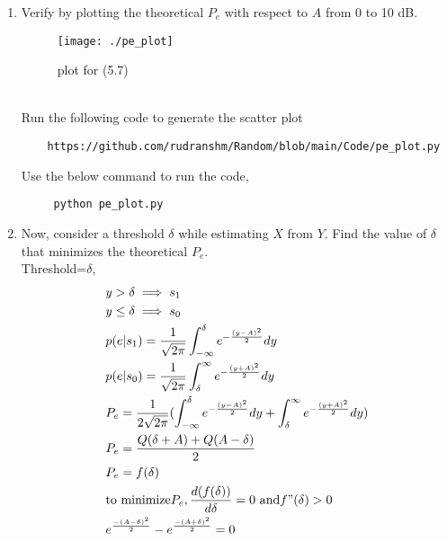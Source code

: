 \documentclass[journal,12pt,twocolumn]{IEEEtran}
\begin{document}
\begin{enumerate}[label=\thesection.\arabic*
,ref=\thesection.\theenumi]
\solution
Total probability of bit error:
\begin{align}
&P_{e}=p(s_1)p(e|s_1)+p(s_0)p(e|s_0)\\
&=\frac{1}{2}[Q(A)+Q(A)]\\
&\because p(s_1)=p(s_0)=\frac{1}{2},\text{X has equiprobable symbols}\\
\nonumber
&=Q(A)\\
&=Q(5)
\end{align}
Since A=5
%
\item
Verify by plotting  the theoretical $P_e$ with respect to $A$ from 0 to 10 dB. \\
\solution
\begin{figure}[!ht]
\texttt{[image: ./pe\_plot]}
\caption{plot for (5.7)}
\label{fig:Plt}
\end{figure}
\\
	Run the following code to generate the scatter plot\\
	\begin{lstlisting}
	https://github.com/rudranshm/Random/blob/main/Code/pe_plot.py
	\end{lstlisting}
	Use the below command to run the code,
	\begin{lstlisting}
     python pe_plot.py 
	\end{lstlisting}
\item Now, consider a threshold $\delta$  while estimating $X$ from $Y$. Find the value of $\delta$ that minimizes the theoretical $P_e$.\\
\solution
Threshold=$\delta$, \\
\begin{align}
 &y>\delta \implies s_1\\
 &y \leq \delta \implies s_0\\
 &p(e|s_1)=\frac{1}{\sqrt{2 \pi}} \int_{-\infty}^{\delta} e^{-\frac{(y-A)^{2}}{2}} dy\\
 \nonumber
 &p(e|s_0)=\frac{1}{\sqrt{2 \pi}} \int_{\delta}^{\infty} e^{-\frac{(y+A)^{2}}{2}} dy\\
\nonumber
&P_e=\frac{1}{2\sqrt{2 \pi}}{( \int_{-\infty}^{\delta} e^{-\frac{(y-A)^{2}}{2}}dy+ \int_{\delta}^{\infty} e^{-\frac{(y+A)^{2}}{2}} dy)}\\
&P_e=\frac{Q(\delta+A)+Q(A-\delta)}{2}\\
&P_e=f(\delta)\\
&\text{to minimize} P_e, \frac{d(f(\delta))}{d\delta}=0 ~\text{and} f"(\delta)>0\\
&e^{\frac{-(A-\delta)^{2}}{2}}-e^{\frac{-(A+\delta)^{2}}{2}}=0\\

\end{align}
\end{enumerate}
\end{document}
